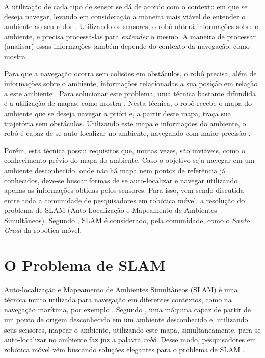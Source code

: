 A utilização de cada tipo de sensor se dá de acordo com o contexto em que se deseja navegar, levando em consideração a maneira mais viável de entender o ambiente ao seu redor \cite{agenteExploratorioKalman}. Utilizando os sensores, o robô obterá informações sobre o ambiente, e precisa processá-las para \textit{entender} o mesmo. A maneira de processar (analisar) essas informações também depende do contexto da navegação, como mostra \cite{roboBulldozerIV}.

Para que a navegação ocorra sem colisões em obstáculos, o robô precisa, além de informações sobre o ambiente, informações relacionadas a sua posição em relação a este ambiente \cite{theCleaningProject}. Para solucionar este problema, uma técnica bastante difundida é a utilização de mapas, como mostra \cite{roboBulldozerIV}. Nesta técnica, o robô recebe o mapa do ambiente que se deseja navegar a prióri e, a partir deste mapa, traça sua trajetória sem obstáculos. Utilizando este mapa e informações do ambiente, o robô é capaz de se auto-localizar no ambiente, navegando com maior precisão \cite{roboBulldozerIV}.

Porém, esta técnica possui requisitos que, muitas vezes, são inviáveis, como o conhecimento prévio do mapa do ambiente. Caso o objetivo seja navegar em um ambiente desconhecido, onde não há mapa nem pontos de referência já conhecidos, deve-se buscar formas de se auto-localizar e navegar utilizando apenas as informações obtidas pelos sensores. Para isso, vem sendo discutida entre toda a comunidade de pesquisadores em robótica móvel, a resolução do problema de SLAM (Auto-Localização e Mapeamento de Ambientes Simultâneos). Segundo \cite{slamProblem}, SLAM é considerado, pela comunidade, como o \textit{Santo Graal} da robótica móvel.

\section{O Problema de SLAM} %
\label{sec:section_name}

Auto-localização e Mapeamento de Ambientes Simultâneos (SLAM) é uma técnica muito utilizada para navegação em diferentes contextos, como na navegação marítima, por exemplo \cite{slamProblem}. Segundo \cite{slamProblem}, uma máquina capaz de partir de um ponto de origem desconhecido em um ambiente desconhecido e, utilizando seus sensores, mapear o ambiente, utilizando este mapa, simultaneamente, para se auto-localizar no ambiente faz juz a palavra \textit{robô}. Desse modo, pesquisadores em robótica móvel vêm buscando soluções elegantes para o problema de SLAM \cite{integrationVisionSLAMnonlinear}.

